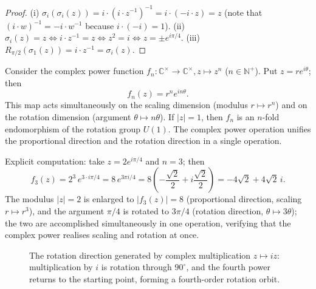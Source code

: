 \begin{proof}
(i) $\sigma_i(\sigma_i(z)) = i \cdot (i \cdot z^{-1})^{-1} = i \cdot (-i \cdot z) = z$ (note that $(i \cdot w)^{-1} = -i \cdot w^{-1}$ because $i \cdot (-i) = 1$).
(ii) $\sigma_i(z) = z \iff i \cdot z^{-1} = z \iff z^2 = i \iff z = \pm e^{i\pi/4}$.
(iii) $R_{\pi/2}(\sigma_1(z)) = i \cdot z^{-1} = \sigma_i(z)$.
\end{proof}

\begin{example}\label{ex:complex_power_scaling_rotation}
Consider the complex power function $f_n: \mathbb{C}^{\times} \to \mathbb{C}^{\times}, z \mapsto z^n$ ($n \in \mathbb{N}^+$). Put $z = re^{i\theta}$; then
\[
f_n(z) = r^n e^{in\theta}.
\]
This map acts simultaneously on the scaling dimension (modulus $r \mapsto r^n$) and on the rotation dimension (argument $\theta \mapsto n\theta$). If $|z|=1$, then $f_n$ is an $n$-fold endomorphism of the rotation group $U(1)$. The complex power operation unifies the proportional direction and the rotation direction in a single operation.

Explicit computation: take $z = 2 e^{i\pi/4}$ and $n = 3$; then
\[
f_3(z) = 2^3\, e^{3 \cdot i\pi/4} = 8\, e^{3\pi i/4} = 8\left(-\frac{\sqrt{2}}{2} + i\frac{\sqrt{2}}{2}\right) = -4\sqrt{2} + 4\sqrt{2}\,i.
\]
The modulus $|z| = 2$ is enlarged to $|f_3(z)| = 8$ (proportional direction, scaling $r \mapsto r^3$), and the argument $\pi/4$ is rotated to $3\pi/4$ (rotation direction, $\theta \mapsto 3\theta$); the two are accomplished simultaneously in one operation, verifying that the complex power realises scaling and rotation at once.
\end{example}

\begin{figure}[htbp]
\centering
{}
\caption{The rotation direction generated by complex multiplication $z \mapsto iz$: multiplication by $i$ is rotation through $90^\circ$, and the fourth power returns to the starting point, forming a fourth-order rotation orbit.}
\label{fig:complex_rotation_i}
\end{figure}

